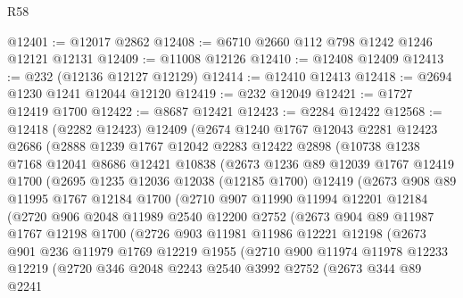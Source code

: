 \begin{lexlean}{R58}
\begin{coremodule}
@12401 := @12017 @2862
@12408 := @6710 @2660 @112 @798 @1242 @1246 @12121 @12131
@12409 := @11008 @12126
@12410 := @12408 @12409
@12413 := @232 (@12136 @12127 @12129)
@12414 := @12410 @12413
@12418 := @2694 @1230 @1241 @12044 @12120
@12419 := @232 @12049
@12421 := @1727 @12419 @1700
@12422 := @8687 @12421
@12423 := @2284 @12422
@12568 := @12418
    (@2282 @12423)
    @12409
    (@2674
      @1240
      @1767
      @12043
      @2281
      @12423
      @2686
      (@2888
        @1239
        @1767
        @12042
        @2283
        @12422
        @2898
        (@10738
          @1238
          @7168
          @12041
          @8686
          @12421
          @10838
          (@2673
            @1236
            @89
            @12039
            @1767
            @12419
            @1700
            (@2695
              @1235
              @12036
              @12038
              (@12185 @1700)
              @12419
              (@2673
                @908
                @89
                @11995
                @1767
                @12184
                @1700
                (@2710
                  @907
                  @11990
                  @11994
                  @12201
                  @12184
                  (@2720
                    @906
                    @2048
                    @11989
                    @2540
                    @12200
                    @2752
                    (@2673
                      @904
                      @89
                      @11987
                      @1767
                      @12198
                      @1700
                      (@2726
                        @903
                        @11981
                        @11986
                        @12221
                        @12198
                        (@2673
                          @901
                          @236
                          @11979
                          @1769
                          @12219
                          @1955
                          (@2710
                            @900
                            @11974
                            @11978
                            @12233
                            @12219
                            (@2720
                              @346
                              @2048
                              @2243
                              @2540
                              @3992
                              @2752
                              (@2673
                                @344
                                @89
                                @2241

\end{coremodule}
\end{lexlean}
